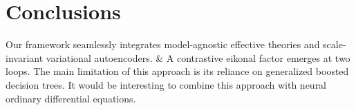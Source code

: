 \section{Conclusions}\label{sec:conclusions}

Our framework seamlessly integrates model-agnostic effective theories
and scale-invariant variational autoencoders. & A contrastive eikonal
factor emerges at two loops. The main limitation of this approach is its
reliance on generalized boosted decision trees. It would be interesting
to combine this approach with neural ordinary differential equations.

